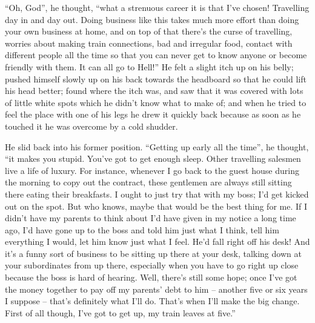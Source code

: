 “Oh, God”, he thought, “what a strenuous career it is that I’ve chosen!
Travelling day in and day out. Doing business like this takes much more
effort than doing your own business at home, and on top of that there’s
the curse of travelling, worries about making train connections, bad
and irregular food, contact with different people all the time so that
you can never get to know anyone or become friendly with them. It can
all go to Hell!” He felt a slight itch up on his belly; pushed himself
slowly up on his back towards the headboard so that he could lift his
head better; found where the itch was, and saw that it was covered with
lots of little white spots which he didn’t know what to make of; and
when he tried to feel the place with one of his legs he drew it quickly
back because as soon as he touched it he was overcome by a cold
shudder.

He slid back into his former position. “Getting up early all the time”,
he thought, “it makes you stupid. You’ve got to get enough sleep. Other
travelling salesmen live a life of luxury. For instance, whenever I go
back to the guest house during the morning to copy out the contract,
these gentlemen are always still sitting there eating their breakfasts.
I ought to just try that with my boss; I’d get kicked out on the spot.
But who knows, maybe that would be the best thing for me. If I didn’t
have my parents to think about I’d have given in my notice a long time
ago, I’d have gone up to the boss and told him just what I think, tell
him everything I would, let him know just what I feel. He’d fall right
off his desk! And it’s a funny sort of business to be sitting up there
at your desk, talking down at your subordinates from up there,
especially when you have to go right up close because the boss is hard
of hearing. Well, there’s still some hope; once I’ve got the money
together to pay off my parents’ debt to him – another five or six years I
suppose – that’s definitely what I’ll do. That’s when I’ll make the big
change. First of all though, I’ve got to get up, my train leaves at
five.”

